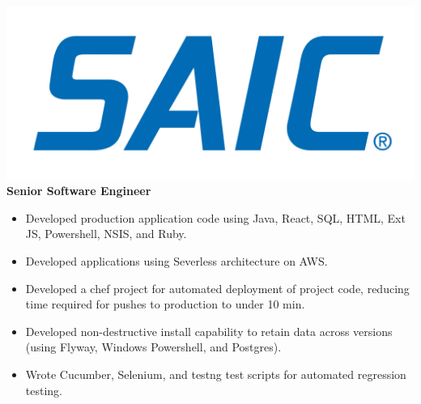 \documentclass[12pt, line, margin]{res}
\begin{document}
\begin{resume}
 \pagebreak
 {\sl  \includegraphics[scale=0.015, trim=110 200 110 120]{resume_images/SAIC_logo_RGB-lg.jpg}}  \newline
                \textbf{Senior Software Engineer} 
                 \begin{itemize}  \itemsep -2pt %
	      \item   Developed production application code using Java, React, SQL, \newline
                                HTML, Ext JS, Powershell, NSIS, and Ruby.
	      \item   Developed applications using Severless architecture on AWS.
	      \item   Developed a chef project for automated deployment of project \newline 
                                code, reducing time required for pushes to production to under 10 min.
	      \item   Developed non-destructive install capability to retain data across\newline
                               versions (using Flyway, Windows Powershell, and Postgres). 
                \item   Wrote Cucumber, Selenium, and testng test scripts for automated \newline
                               regression testing.
                \end{itemize}
 


\end{resume}
\end{document}
